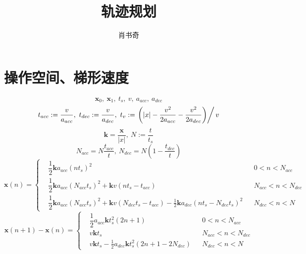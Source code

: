 \documentclass{tufte-handout}
\title{轨迹规划}
\author{肖书奇}
\begin{document}
\maketitle
\section{操作空间、梯形速度}
\[
    \mathbf x_0,\ \mathbf x_1,\ t_s,\ v,\ a_{acc},\ a_{dec}
\]
\[
    t_{acc} := \frac{v}{a_{acc}},\ t_{dec} := \frac{v}{a_{dec}},\ t_v := \left.\left(\vert x\vert-\frac{v^2}{2a_{acc}}-\frac{v^2}{2a_{dec}}\right)\right/v
\]
\[
    \mathbf k = \frac{\mathbf x}{\vert x\vert},\ N:=\frac{t}{t_s}
\]
\[
    N_{acc} = N\frac{t_{acc}}{t},\ N_{dec} = N(1-\frac{t_{dec}}{t})
\]
\[
    \mathbf x(n) = \left\{\begin{aligned}
         & \dfrac{1}{2}\mathbf k a_{acc}(nt_s)^2                                                                                     &  & 0<n<N_{acc}       \\
         & \dfrac{1}{2}\mathbf k a_{acc}(N_{acc}t_s)^2 + \mathbf k v(nt_s-t_{acc})                                                      &  & N_{acc}<n<N_{dec} \\
         & \dfrac{1}{2}\mathbf k a_{acc}(N_{acc}t_s)^2 + \mathbf k v(N_{dec}t_s-t_{acc}) - \frac{1}{2}\mathbf k a_{dec}(nt_s-N_{dec}t_s)^2 &  & N_{dec}<n<N
    \end{aligned}\right.
\]
\[
    \mathbf x(n+1)- \mathbf x(n) = \left\{\begin{aligned}
         & \dfrac{1}{2} a_{acc} \mathbf k t_s^2(2n+1)                      &  & 0<n<N_{acc}       \\
         & v\mathbf kt_s                                                   &  & N_{acc}<n<N_{dec} \\
         & v \mathbf k t_s-\frac{1}{2} a_{dec} \mathbf k t_s^2(2n+1-2N_{dec}) &  & N_{dec}<n<N
    \end{aligned}\right.
\]
\end{document}
